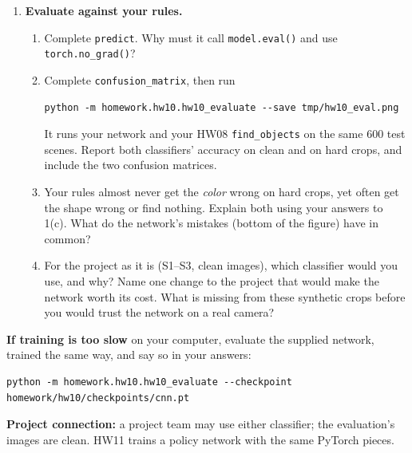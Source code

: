\begin{enumerate}
\item \textbf{Evaluate against your rules.}
\begin{enumerate}
\item Complete \texttt{predict}. Why must it call \texttt{model.eval()} and
use \texttt{torch.no\_grad()}?
\item Complete \texttt{confusion\_matrix}, then run
\begin{lstlisting}
python -m homework.hw10.hw10_evaluate --save tmp/hw10_eval.png
\end{lstlisting}
It runs your network and your HW08 \texttt{find\_objects} on the same 600
test scenes. Report both classifiers' accuracy on clean and on hard crops,
and include the two confusion matrices.
\item Your rules almost never get the \emph{color} wrong on hard crops, yet
often get the shape wrong or find nothing. Explain both using your answers
to 1(c). What do the network's mistakes (bottom of the figure) have in
common?
\item For the project as it is (S1--S3, clean images), which classifier
would you use, and why? Name one change to the project that would make the
network worth its cost. What is missing from these synthetic crops before
you would trust the network on a real camera?
\end{enumerate}
\end{enumerate}

\textbf{If training is too slow} on your computer, evaluate the supplied
network, trained the same way, and say so in your answers:
\begin{lstlisting}
python -m homework.hw10.hw10_evaluate --checkpoint homework/hw10/checkpoints/cnn.pt
\end{lstlisting}

\textbf{Project connection:} a project team may use either classifier; the
evaluation's images are clean. HW11 trains a policy network with the same
PyTorch pieces.

\submission

